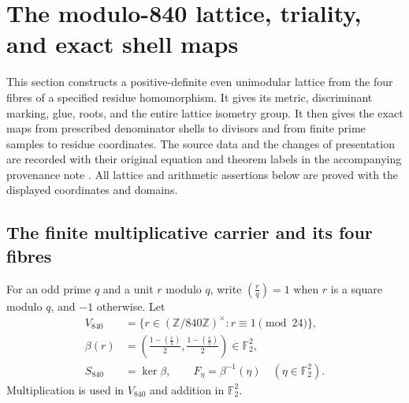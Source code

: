 
\section{The modulo-840 lattice, triality, and exact shell maps}
\label{esn:sec:shared}

This section constructs a positive-definite even unimodular lattice from
the four fibres of a specified residue homomorphism.  It gives its metric,
discriminant marking, glue, roots, and the entire lattice isometry group.
It then gives the exact maps from prescribed denominator shells to
divisors and from finite prime samples to residue coordinates.  The source
data and the changes of presentation are recorded with their original
equation and theorem labels in the accompanying provenance note
\cite{esn:Provenance}.  All lattice and arithmetic assertions below are
proved with the displayed coordinates and domains.

\subsection{The finite multiplicative carrier and its four fibres}
\label{esn:subsec:residues}

For an odd prime \(q\) and a unit \(r\) modulo \(q\), write
\(\left(\frac rq\right)=1\) when \(r\) is a square modulo \(q\),
and \(-1\) otherwise.  Let
\begin{equation}
 \begin{split}
 V_{840}&=\{r\in(\mathbb Z/840\mathbb Z)^\times:
                                      r\equiv1\pmod {24}\},\\
 \beta(r)&=\left(\frac{1-\left(\frac r5\right)}2,
                  \frac{1-\left(\frac r7\right)}2\right)
                          \in\mathbb F_2^2,\\
 S_{840}&=\ker\beta,\qquad F_\eta=\beta^{-1}(\eta)
                                      \quad(\eta\in\mathbb F_2^2).
 \end{split}
 \label{esn:eq:residue-carrier}
\end{equation}
Multiplication is used in \(V_{840}\) and addition in \(\mathbb F_2^2\).

